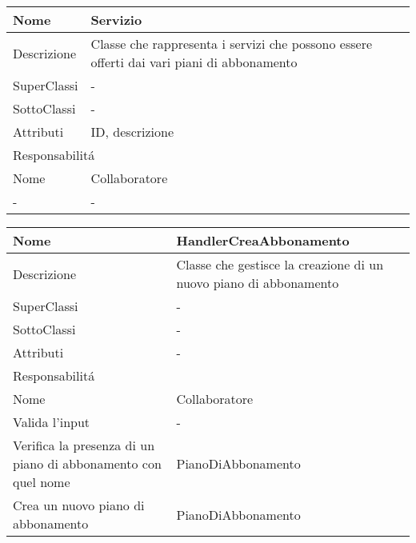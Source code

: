 \begin{center}
    \begin{longtable}{ |p{3cm}|p{3cm}|p{3cm}|p{3cm}| }
        \hline
        Nome & \multicolumn{3}{|p{9cm}|}{Servizio} \\\hline
        Descrizione & \multicolumn{3}{|p{9cm}|}{Classe che rappresenta i servizi che possono essere offerti dai vari piani di abbonamento} \\\hline
        SuperClassi & \multicolumn{3}{|p{9cm}|}{-} \\\hline
        SottoClassi & \multicolumn{3}{|p{9cm}|}{-} \\\hline
        Attributi & \multicolumn{3}{|p{9cm}|}{ID, descrizione} \\\hline
        \multicolumn{4}{|p{12cm}|}{Responsabilit\'a} \\\hline
        \multicolumn{2}{|p{6cm}|}{Nome} & \multicolumn{2}{|p{6cm}|}{Collaboratore} \\\hline
        \multicolumn{2}{|p{6cm}|}{-} & \multicolumn{2}{|p{6cm}|}{-} \\\hline
    \end{longtable}
\end{center}

\begin{center}
    \begin{longtable}{ |p{3cm}|p{3cm}|p{3cm}|p{3cm}| }
        \hline
        Nome & \multicolumn{3}{|p{9cm}|}{HandlerCreaAbbonamento} \\\hline
        Descrizione & \multicolumn{3}{|p{9cm}|}{Classe che gestisce la creazione di un nuovo piano di abbonamento} \\\hline
        SuperClassi & \multicolumn{3}{|p{9cm}|}{-} \\\hline
        SottoClassi & \multicolumn{3}{|p{9cm}|}{-} \\\hline
        Attributi & \multicolumn{3}{|p{9cm}|}{-} \\\hline
        \multicolumn{4}{|p{12cm}|}{Responsabilit\'a} \\\hline
        \multicolumn{2}{|p{6cm}|}{Nome} & \multicolumn{2}{|p{6cm}|}{Collaboratore} \\\hline
        \multicolumn{2}{|p{6cm}|}{Valida l'input} & \multicolumn{2}{|p{6cm}|}{-} \\\hline
        \multicolumn{2}{|p{6cm}|}{Verifica la presenza di un piano di abbonamento con quel nome} & \multicolumn{2}{|p{6cm}|}{PianoDiAbbonamento} \\\hline
        \multicolumn{2}{|p{6cm}|}{Crea un nuovo piano di abbonamento} & \multicolumn{2}{|p{6cm}|}{PianoDiAbbonamento} \\\hline
    \end{longtable}
\end{center}

